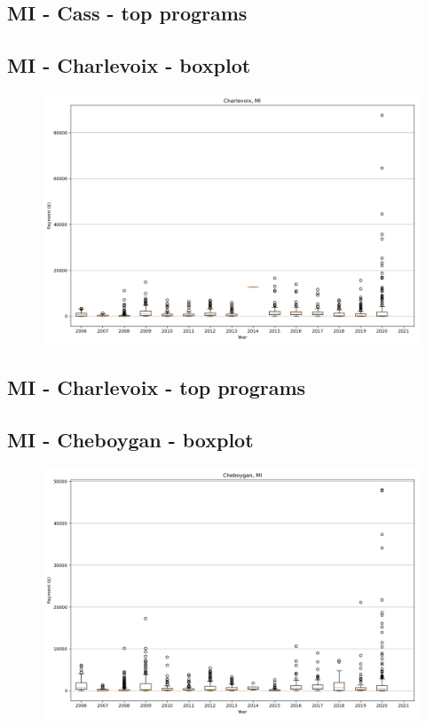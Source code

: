 \subsection*{MI - Cass - top programs}

\newpage
\subsection*{MI - Charlevoix - boxplot}
\begin{figure}[h]
\centering
\includegraphics[width=7in]{../output/boxplots/counties/Charlevoix-MI_boxplot.png}
\end{figure}


\subsection*{MI - Charlevoix - top programs}

\newpage
\subsection*{MI - Cheboygan - boxplot}
\begin{figure}[h]
\centering
\includegraphics[width=7in]{../output/boxplots/counties/Cheboygan-MI_boxplot.png}
\end{figure}


